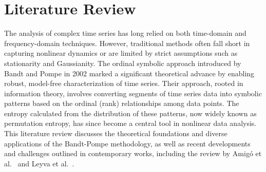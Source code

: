 \chapter{Literature Review}\label{C:lit}

The analysis of complex time series has long relied on both time-domain and frequency-domain techniques. However, traditional methods often fall short in capturing nonlinear dynamics or are limited by strict assumptions such as stationarity and Gaussianity. The ordinal symbolic approach introduced by Bandt and Pompe in 2002 marked a significant theoretical advance by enabling robust, model-free characterization of time series. Their approach, rooted in information theory, involves converting segments of time series data into symbolic patterns based on the ordinal (rank) relationships among data points. The entropy calculated from the distribution of these patterns, now widely known as permutation entropy, has since become a central tool in nonlinear data analysis. This literature review discusses the theoretical foundations and diverse applications of the Bandt-Pompe methodology, as well as recent developments and challenges outlined in contemporary works, including the review by Amigó et al.~\cite{amigo2023ordinal} and Leyva et al.~\cite{Leyva2022}.



